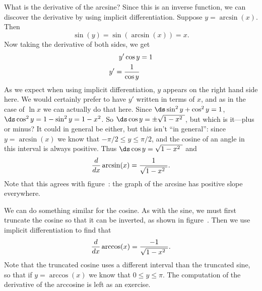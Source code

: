 What is the derivative of the arcsine? Since this is an inverse
function, we can discover the derivative by using implicit
differentiation. Suppose $y=\arcsin(x)$. Then 
$$\sin(y)=\sin(\arcsin(x))=x.$$
Now taking the derivative of both sides, we get
\begin{align*}
y'\cos y &= 1 \\
y'={1\over \cos y} \\
\end{align*}
As we expect when using implicit differentiation, $y$ appears on the
right hand side here. We would certainly prefer to have $y'$ written
in terms of $x$, and as in the case of $\ln x$ we can actually do that
here. Since $\ds \sin^2y+\cos^2 y=1$, $\ds \cos^2y=1-\sin^2y=1-x^2$. So 
$\ds \cos y=\pm\sqrt{1-x^2\ }$, but which is it---plus or minus? It could
in general be either, but this isn't ``in general'': since
$y=\arcsin(x)$ we know that $-\pi/2\le y\le \pi/2$, and the cosine of
an angle in this interval is always positive. Thus
$\ds \cos y=\sqrt{1-x^2\ }$ and
$${d\over dx}\arcsin(x)={1\over \sqrt{1-x^2\ }}.$$
Note that this agrees with figure~: the
graph of the arcsine has positive slope everywhere.

We can do something similar for the cosine. As with the sine, we must
first truncate the cosine so that it can be inverted, as shown in
figure~. Then we use
implicit differentiation to find that
$${d\over dx}\arccos(x)={-1\over \sqrt{1-x^2\ }}.$$ Note that the
truncated cosine uses a different interval than the truncated sine, so
that if $y=\arccos(x)$ we know that $0\le y\le \pi$. The computation
of the derivative of the arccosine is left as an exercise.

